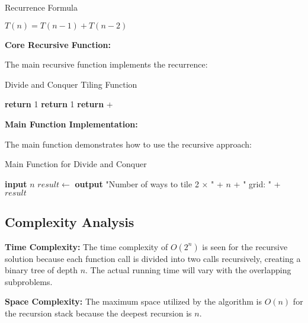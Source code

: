 \documentclass[conference]{IEEEtran}
\begin{document}
\begin{algorithm}[htbp]
\caption{Recurrence Formula}
\begin{algorithmic}[1]
\State $T(n) = T(n-1) + T(n-2)$
\State {}
\end{algorithmic}
\end{algorithm}

\textbf{Core Recursive Function:}

The main recursive function implements the recurrence:

\begin{algorithm}[htbp]
\caption{Divide and Conquer Tiling Function}
\begin{algorithmic}[1]
        \State \textbf{return} 1
    \EndIf
        \State \textbf{return} 1
    \EndIf
    \State \textbf{return}  + 
\EndProcedure
\end{algorithmic}
\end{algorithm}

\textbf{Main Function Implementation:}

The main function demonstrates how to use the recursive approach:

\begin{algorithm}[htbp]
\caption{Main Function for Divide and Conquer}
\begin{algorithmic}[1]
    \State \textbf{input} $n$ 
    \State $result \gets$ 
    \State \textbf{output} "Number of ways to tile 2 × " + $n$ + " grid: " + $result$
\EndProcedure
\end{algorithmic}
\end{algorithm}

\subsection{Complexity Analysis}

\textbf{Time Complexity:} The time complexity of $O(2^n)$ is seen for the recursive solution because each function call is divided into two calls recursively, creating a binary tree of depth $n$. The actual running time will vary with the overlapping subproblems.

\textbf{Space Complexity:} The maximum space utilized by the algorithm is $O(n)$ for the recursion stack because the deepest recursion is $n$.
\end{document}
